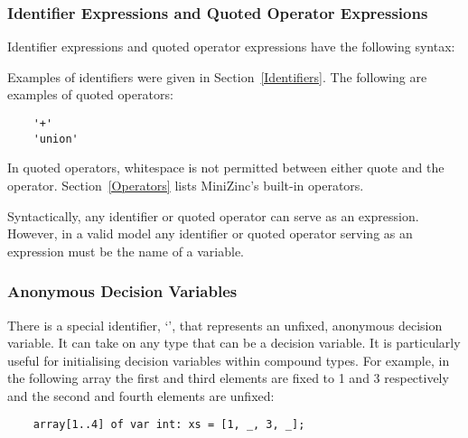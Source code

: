 \documentclass[10pt]{scrartcl}
\newcommand{\underscore}{\texttt{\n{}}}
\begin{document}
\subsubsection{Identifier Expressions and Quoted Operator Expressions}
        \label{Identifier Expressions and Quoted Operator Expressions}
Identifier expressions and quoted operator expressions have the following
syntax:
\begin{productions}
    \RuleIdentOrQuotedOp
\end{productions}
Examples of identifiers were given in Section~\ref{Identifiers}.  The
following are examples of quoted operators:
\begin{verbatim}
    '+'
    'union'
\end{verbatim}
In quoted operators, whitespace is not permitted between either quote
and the operator.  Section~\ref{Operators} lists MiniZinc's built-in operators.

Syntactically, any identifier or quoted operator can serve as an expression.
However, in a valid model any identifier or quoted operator serving as an
expression must be the name of a variable.

\subsubsection{Anonymous Decision Variables}
        \label{Anonymous Decision Variables}
There is a special identifier, `\underscore', that represents an unfixed,
anonymous decision variable.  It can take on any type that can be a decision
variable.  It is particularly useful for initialising decision variables
within compound types.  For example, in the following array the first and
third elements are fixed to 1 and 3 respectively and the second and fourth
elements are unfixed:
\begin{verbatim}
    array[1..4] of var int: xs = [1, _, 3, _];
\end{verbatim}
\end{document}
